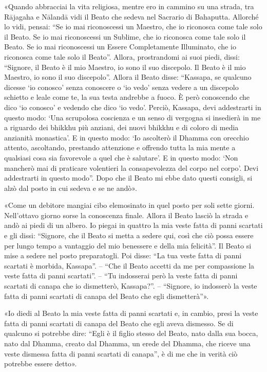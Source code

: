 «Quando abbracciai la vita religiosa, mentre ero in cammino su una
strada, tra Rājagaha e Nālandā vidi il Beato che sedeva nel Sacrario di
Bahaputta. Allorché lo vidi, pensai: “Se io mai riconoscessi un Maestro,
che io riconosca come tale solo il Beato. Se io mai riconoscessi un
Sublime, che io riconosca come tale solo il Beato. Se io mai
riconoscessi un Essere Completamente Illuminato, che io riconosca come
tale solo il Beato”. Allora, prostrandomi ai suoi piedi, dissi:
“Signore, il Beato è il mio Maestro, io sono il suo discepolo. Il Beato
è il mio Maestro, io sono il suo discepolo”. Allora il Beato disse:
“Kassapa, se qualcuno dicesse ‘io conosco’ senza conoscere o ‘io vedo’
senza vedere a un discepolo schietto e leale come te, la sua testa
andrebbe a fuoco. È però conoscendo che dico ‘io conosco’ e vedendo che
dico ‘io vedo’. Perciò, Kassapa, devi addestrarti in questo modo: ‘Una
scrupolosa coscienza e un senso di vergogna si insedierà in me a
riguardo dei bhikkhu più anziani, dei nuovi bhikkhu e di coloro di media
anzianità monastica’. E in questo modo: ‘Io ascolterò il Dhamma con
orecchio attento, ascoltando, prestando attenzione e offrendo tutta la
mia mente a qualsiasi cosa sia favorevole a quel che è salutare’. E in
questo modo: ‘Non mancherò mai di praticare volentieri la consapevolezza
del corpo nel corpo’. Devi addestrarti in questo modo”. Dopo che il
Beato mi ebbe dato questi consigli, si alzò dal posto in cui sedeva e se
ne andò».


«Come un debitore mangiai cibo elemosinato in quel posto per soli sette
giorni. Nell’ottavo giorno sorse la conoscenza finale. Allora il Beato
lasciò la strada e andò ai piedi di un albero. Io piegai in quattro la
mia veste fatta di panni scartati e gli dissi: “Signore, che il Beato si
metta a sedere qui, così che ciò possa essere per lungo tempo a
vantaggio del mio benessere e della mia felicità”. Il Beato si mise a
sedere nel posto preparatogli. Poi disse: “La tua veste fatta di panni
scartati è morbida, Kassapa”. – “Che il Beato accetti da me per
compassione la veste fatta di panni scartati”. – “Tu indosserai però la
veste fatta di panni scartati di canapa che io dismetterò, Kassapa?”. –
“Signore, io indosserò la veste fatta di panni scartati di canapa del
Beato che egli dismetterà”».


«Io diedi al Beato la mia veste fatta di panni scartati e, in cambio,
presi la veste fatta di panni scartati di canapa del Beato che egli
aveva dismesso. Se di qualcuno si potrebbe dire: “Egli è il figlio
stesso del Beato, nato dalla sua bocca, nato dal Dhamma, creato dal
Dhamma, un erede del Dhamma, che riceve una veste dismessa fatta di
panni scartati di canapa”, è di me che in verità ciò potrebbe essere
detto».


